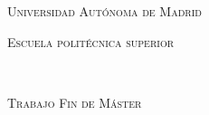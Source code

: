\begin{titlepage}

\begin{center}

\vspace*{2cm}

\LARGE \textsc{Universidad Autónoma de Madrid}\\

\vspace{.2cm}

\large \textsc{Escuela politécnica superior}\\

\vspace{.2cm}

\begin{figure}[h]
    \begin{center}
        \begin{minipage}[c]{0.495\linewidth}
        \end{minipage}
        \begin{minipage}[c]{0.495\linewidth}
        \end{minipage}
    \end{center}
    \label{fig:Escudos}
\end{figure}

\Huge \carrera\\

\vspace{1cm}

\Huge \textsc{Trabajo Fin de Máster}\\

\vspace{1.5cm}

\Huge \MakeUppercase{\textbf{\titulo}}

\vspace{3cm}


\Large \autor\\
\Large \director\\
\Large \ponente\\

\vspace{0.5cm}

\Large \fecha

\end{center}

\end{titlepage}

\normalsize


\newpage \thispagestyle{empty} %
